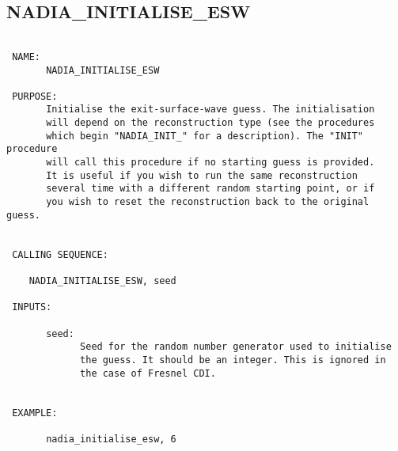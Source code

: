 \subsection{NADIA\_INITIALISE\_ESW}
\begin{verbatim}

 NAME:
       NADIA_INITIALISE_ESW

 PURPOSE:
       Initialise the exit-surface-wave guess. The initialisation
       will depend on the reconstruction type (see the procedures
       which begin "NADIA_INIT_" for a description). The "INIT" procedure  
       will call this procedure if no starting guess is provided. 
       It is useful if you wish to run the same reconstruction
       several time with a different random starting point, or if 
       you wish to reset the reconstruction back to the original guess.


 CALLING SEQUENCE:

	NADIA_INITIALISE_ESW, seed

 INPUTS:

       seed: 
             Seed for the random number generator used to initialise
             the guess. It should be an integer. This is ignored in 
             the case of Fresnel CDI.


 EXAMPLE:

       nadia_initialise_esw, 6

\end{verbatim}



